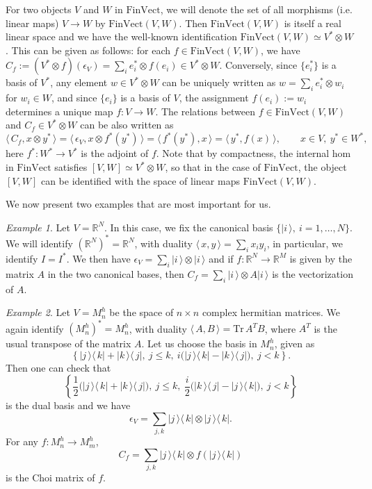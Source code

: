 \documentclass[12pt]{article}
\theoremstyle{definition}
\theoremstyle{remark}
\newtheorem{exm}{Example}
\def \Tr{\mathrm{Tr}\,}
\def\<{\langle\,}
\def\>{\,\rangle}
\def \FV{\mathrm{FinVect}}
\begin{document}
For two objects $V$ and $W$ in $\FV$, we will denote the set of all morphisms (i.e. linear
maps) $V\to
W$ by $\FV(V,W)$. Then $\FV(V,W)$ is itself a real linear space and  we have the well-known identification 
$\FV(V,W)\simeq V^*\otimes W$. This can be given as follows: for each $f\in \FV(V,W)$, we have 
$C_f:=(V^*\otimes f)(\epsilon_V)=\sum_i e_i^*\otimes f(e_i)\in V^*\otimes W$. Conversely,
since $\{e_i^*\}$ is a basis of $V^*$, 
any element $w\in V^*\otimes W$ can be uniquely written as $w=\sum_i e_i^*\otimes w_i$ for
$w_i\in W$, and since $\{e_i\}$ is a basis of $V$, the assignment $f(e_i):=w_i$ determines a
unique map $f:V\to W$. The relations between $f\in \FV(V,W)$ and $C_f\in V^*\otimes W$ can
be also written as
\[
\<C_f,x\otimes y^*\>=\<\epsilon_V,x\otimes f^*(y^*)\>=\<f^*(y^*),x\>=\<y^*,f(x)\>,\qquad x\in
V,\ y^*\in W^*,
\]
here $f^*:W^*\to V^*$ is the adjoint of $f$.
Note that by compactness, the internal hom in $\FV$ satisfies $[V,W]\simeq V^*\otimes W$,
so that  in the case of $\FV$, the object $[V,W]$ can be identified with the space of linear
maps $\FV(V,W)$. 

We now present two examples that are most important for us.

\begin{exm}\label{exm:classical} Let $V=\mathbb R^N$. In this case, we fix the canonical basis $\{|i\>,\
i=1,\dots,N\}$. We will identify $(\mathbb R^N)^*=\mathbb R^N$, with duality
$\<x,y\>=\sum_i x_iy_i$, in particular, we identify $I=I^*$. We then have
$\epsilon_V=\sum_i |i\>\otimes |i\>$ and if $f:\mathbb R^N\to \mathbb R^M$ is given by the
matrix $A$ in the two canonical bases, then  $C_f=\sum_i |i\>\otimes A|i\>$ is the
vectorization of $A$.

\end{exm}


\begin{exm}\label{exm:quantum} Let $V=M_n^h$ be the space of $n\times n$ complex hermitian matrices. We again
identify $(M_n^h)^*=M_n^h$, with duality $\<A,B\>=\Tr A^TB$, where $A^T$ is the usual
transpose of the matrix $A$. Let us choose the basis in $M_n^h$, given as
\[
\left\{|j\>\<k|+|k\>\<j|,\ j\le k,\ i\biggl(|j\>\<k|-|k\>\<j|\biggr),\ j<k\right\}.
\]
Then one can check that
\[
\left\{\frac12\biggl(|j\>\<k|+|k\>\<j|\biggl),\ j\le k,\
\frac{i}{2}\biggl(|k\>\<j|-|j\>\<k|\biggr),\ j<k\right\}
\]
is the dual basis and we have
\[
\epsilon_V=\sum_{j,k} |j\>\<k|\otimes |j\>\<k|.
\]
For any $f:M_n^h\to M_m^h$, 
\[
C_f=\sum_{j,k} |j\>\<k|\otimes f(|j\>\<k|)
\]
is the Choi matrix of $f$.

\end{exm}
\end{document}
